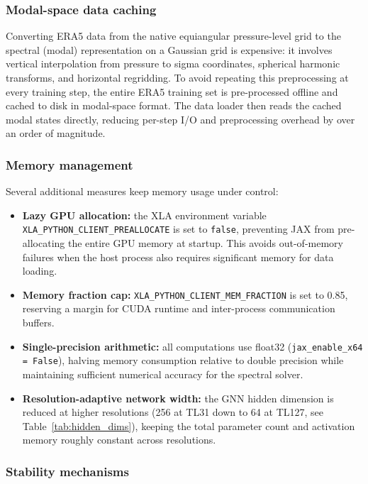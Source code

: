 \subsubsection{Modal-space data caching}

Converting ERA5 data from the native equiangular pressure-level grid to the spectral (modal) representation on a Gaussian grid is expensive: it involves vertical interpolation from pressure to sigma coordinates, spherical harmonic transforms, and horizontal regridding.
To avoid repeating this preprocessing at every training step, the entire ERA5 training set is pre-processed offline and cached to disk in modal-space format.
The data loader then reads the cached modal states directly, reducing per-step I/O and preprocessing overhead by over an order of magnitude.

\subsubsection{Memory management}

Several additional measures keep memory usage under control:
\begin{itemize}
    \item \textbf{Lazy GPU allocation:} the XLA environment variable \texttt{XLA\_PYTHON\_CLIENT\_PREALLOCATE} is set to \texttt{false}, preventing JAX from pre-allocating the entire GPU memory at startup. This avoids out-of-memory failures when the host process also requires significant memory for data loading.
    \item \textbf{Memory fraction cap:} \texttt{XLA\_PYTHON\_CLIENT\_MEM\_FRACTION} is set to 0.85, reserving a margin for CUDA runtime and inter-process communication buffers.
    \item \textbf{Single-precision arithmetic:} all computations use float32 (\texttt{jax\_enable\_x64 = False}), halving memory consumption relative to double precision while maintaining sufficient numerical accuracy for the spectral solver.
    \item \textbf{Resolution-adaptive network width:} the GNN hidden dimension is reduced at higher resolutions (256 at TL31 down to 64 at TL127, see Table~\ref{tab:hidden_dims}), keeping the total parameter count and activation memory roughly constant across resolutions.
\end{itemize}

\subsubsection{Stability mechanisms}

